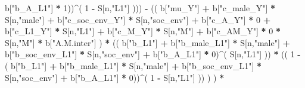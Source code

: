 \documentclass[
]{book}
\newenvironment{Shaded}{\begin{snugshade}}{\end{snugshade}}
\newcommand{\DecValTok}[1]{\textcolor[rgb]{0.00,0.00,0.81}{#1}}
\newcommand{\NormalTok}[1]{#1}
\newcommand{\SpecialCharTok}[1]{\textcolor[rgb]{0.81,0.36,0.00}{\textbf{#1}}}
\newcommand{\StringTok}[1]{\textcolor[rgb]{0.31,0.60,0.02}{#1}}
\begin{document}
\begin{Shaded}
\begin{Highlighting}[]
\NormalTok{                                 b[}\StringTok{"b\_A\_L1"}\NormalTok{] }\SpecialCharTok{*} \DecValTok{1}\NormalTok{))}\SpecialCharTok{\^{}}\NormalTok{( }\DecValTok{1} \SpecialCharTok{{-}}\NormalTok{ S[n,}\StringTok{"L1"}\NormalTok{] ))) }\SpecialCharTok{{-}} 
\NormalTok{                      (( b[}\StringTok{"mu\_Y"}\NormalTok{] }\SpecialCharTok{+} 
\NormalTok{                          b[}\StringTok{"c\_male\_Y"}\NormalTok{] }\SpecialCharTok{*}\NormalTok{ S[n,}\StringTok{"male"}\NormalTok{] }\SpecialCharTok{+} 
\NormalTok{                          b[}\StringTok{"c\_soc\_env\_Y"}\NormalTok{] }\SpecialCharTok{*}\NormalTok{ S[n,}\StringTok{"soc\_env"}\NormalTok{] }\SpecialCharTok{+} 
\NormalTok{                          b[}\StringTok{"c\_A\_Y"}\NormalTok{] }\SpecialCharTok{*} \DecValTok{0} \SpecialCharTok{+} 
\NormalTok{                          b[}\StringTok{"c\_L1\_Y"}\NormalTok{] }\SpecialCharTok{*}\NormalTok{ S[n,}\StringTok{"L1"}\NormalTok{] }\SpecialCharTok{+}
\NormalTok{                          b[}\StringTok{"c\_M\_Y"}\NormalTok{] }\SpecialCharTok{*}\NormalTok{ S[n,}\StringTok{"M"}\NormalTok{] }\SpecialCharTok{+}
\NormalTok{                          b[}\StringTok{"c\_AM\_Y"}\NormalTok{] }\SpecialCharTok{*} \DecValTok{0} \SpecialCharTok{*}\NormalTok{ S[n,}\StringTok{"M"}\NormalTok{] }\SpecialCharTok{*}\NormalTok{ b[}\StringTok{"A.M.inter"}\NormalTok{] ) }\SpecialCharTok{*}
\NormalTok{                      (( b[}\StringTok{"b\_L1"}\NormalTok{] }\SpecialCharTok{+}
\NormalTok{                           b[}\StringTok{"b\_male\_L1"}\NormalTok{] }\SpecialCharTok{*}\NormalTok{ S[n,}\StringTok{"male"}\NormalTok{] }\SpecialCharTok{+}  
\NormalTok{                           b[}\StringTok{"b\_soc\_env\_L1"}\NormalTok{] }\SpecialCharTok{*}\NormalTok{ S[n,}\StringTok{"soc\_env"}\NormalTok{] }\SpecialCharTok{+}
\NormalTok{                           b[}\StringTok{"b\_A\_L1"}\NormalTok{] }\SpecialCharTok{*} \DecValTok{0}\NormalTok{)}\SpecialCharTok{\^{}}\NormalTok{( S[n,}\StringTok{"L1"}\NormalTok{] )) }\SpecialCharTok{*}
\NormalTok{                      (( }\DecValTok{1} \SpecialCharTok{{-}}\NormalTok{ ( b[}\StringTok{"b\_L1"}\NormalTok{] }\SpecialCharTok{+}
\NormalTok{                                 b[}\StringTok{"b\_male\_L1"}\NormalTok{] }\SpecialCharTok{*}\NormalTok{ S[n,}\StringTok{"male"}\NormalTok{] }\SpecialCharTok{+}  
\NormalTok{                                 b[}\StringTok{"b\_soc\_env\_L1"}\NormalTok{] }\SpecialCharTok{*}\NormalTok{ S[n,}\StringTok{"soc\_env"}\NormalTok{] }\SpecialCharTok{+}
\NormalTok{                                 b[}\StringTok{"b\_A\_L1"}\NormalTok{] }\SpecialCharTok{*} \DecValTok{0}\NormalTok{))}\SpecialCharTok{\^{}}\NormalTok{( }\DecValTok{1} \SpecialCharTok{{-}}\NormalTok{ S[n,}\StringTok{"L1"}\NormalTok{] )) ) ) }\SpecialCharTok{*}

\end{Highlighting}
\end{Shaded}
\end{document}
